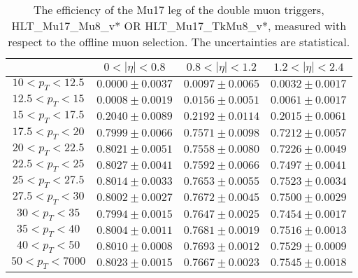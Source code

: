 \begin{table}[!ht]
\begin{center}
\begin{tabular}{c|c|c|c}
\hline & $0 < |\eta| < 0.8$ & $0.8 < |\eta| < 1.2$ & $1.2 < |\eta| < 2.4$  \\
\hline
$ 10 < p_T < 12.5$ & $0.0000 \pm 0.0037$ & $0.0097 \pm 0.0065$ & $0.0032 \pm 0.0017$  \\
$12.5 < p_T <  15$ & $0.0008 \pm 0.0019$ & $0.0156 \pm 0.0051$ & $0.0061 \pm 0.0017$  \\
$ 15 < p_T < 17.5$ & $0.2040 \pm 0.0089$ & $0.2192 \pm 0.0114$ & $0.2015 \pm 0.0061$  \\
$17.5 < p_T <  20$ & $0.7999 \pm 0.0066$ & $0.7571 \pm 0.0098$ & $0.7212 \pm 0.0057$  \\
$ 20 < p_T < 22.5$ & $0.8021 \pm 0.0051$ & $0.7558 \pm 0.0080$ & $0.7226 \pm 0.0049$  \\
$22.5 < p_T <  25$ & $0.8027 \pm 0.0041$ & $0.7592 \pm 0.0066$ & $0.7497 \pm 0.0041$  \\
$ 25 < p_T < 27.5$ & $0.8014 \pm 0.0033$ & $0.7653 \pm 0.0055$ & $0.7523 \pm 0.0034$  \\
$27.5 < p_T <  30$ & $0.8002 \pm 0.0027$ & $0.7672 \pm 0.0045$ & $0.7500 \pm 0.0029$  \\
$ 30 < p_T <  35$ & $0.7994 \pm 0.0015$ & $0.7647 \pm 0.0025$ & $0.7454 \pm 0.0017$  \\
$ 35 < p_T <  40$ & $0.8004 \pm 0.0011$ & $0.7681 \pm 0.0019$ & $0.7516 \pm 0.0013$  \\
$ 40 < p_T <  50$ & $0.8010 \pm 0.0008$ & $0.7693 \pm 0.0012$ & $0.7529 \pm 0.0009$  \\
$ 50 < p_T < 7000$ & $0.8023 \pm 0.0015$ & $0.7667 \pm 0.0023$ & $0.7545 \pm 0.0018$  \\
\hline
\hline
\end{tabular}
\caption{The efficiency of the Mu17 leg of the double muon triggers,
HLT\_Mu17\_Mu8\_v* OR HLT\_Mu17\_TkMu8\_v*,
measured with respect to the offline muon selection. 
The uncertainties are statistical.}
\label{tab:eff_muon_lead_dbl}
\end{center}
\end{table}


